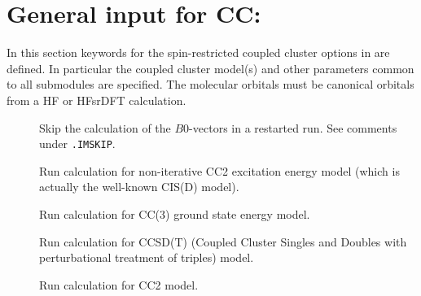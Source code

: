 \section{General input for CC: }\label{sec:ccgeneral}

In this section keywords for the spin-restricted coupled
cluster options in \dalton are defined. In particular the coupled cluster 
model(s) and other parameters common to all submodules are specified.
The molecular orbitals must be canonical orbitals from a HF or HFsrDFT calculation.

\begin{description}
\item[] 
   Skip the calculation of the $B0$-vectors 
   in a restarted run. See comments under \verb|.IMSKIP|.
%
\item[]  
        Run calculation for non-iterative CC2 excitation energy model 
        (which is actually the well-known CIS(D) model).
 
\item[]  
       Run calculation for CC(3) ground state energy model.

\item[]  
        Run calculation for CCSD(T) (Coupled Cluster Singles and 
        Doubles with perturbational treatment of triples) model.
%
\item[]    
        Run calculation for CC2 model. 
 

\end{description}
